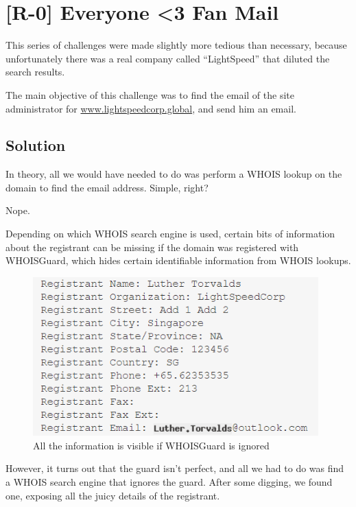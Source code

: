 
\section{[R-0] Everyone <3 Fan Mail}

	This series of challenges were made slightly more tedious than necessary, because unfortunately there was a real company
	called \enquote{LightSpeed} that diluted the search results.

	The main objective of this challenge was to find the email of the site administrator for \url{www.lightspeedcorp.global}, and
	send him an email.

	\subsection{Solution}

		In theory, all we would have needed to do was perform a WHOIS lookup on the domain to find the email address. Simple,
		right?

		Nope.

		Depending on which WHOIS search engine is used, certain bits of information about the registrant can be missing if the
		domain was registered with WHOISGuard, which hides certain identifiable information from WHOIS lookups.

		\begin{figure}[!htbp]\centering
			\includegraphics[width=110mm]{figures/osintred/r0.png} \vspace{5mm}
			\caption{All the information is visible if WHOISGuard is ignored}
		\end{figure}

		\pagebreak
		However, it turns out that the guard isn't perfect, and all we had to do was find a WHOIS search engine that ignores the
		guard. After some digging, we found one, exposing all the juicy details of the registrant.

